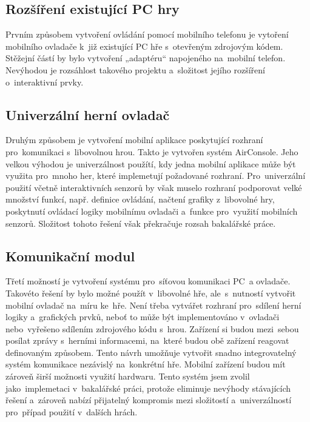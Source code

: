 \documentclass[thesis=B,czech,hidelinks]{FITthesis}[2012/06/26] %
\begin{document}
\subsection{Rozšíření existující PC hry}

Prvním způsobem vytvoření ovládání pomocí mobilního telefonu je vytoření mobilního ovladače k~již existující PC hře s~otevřeným zdrojovým kódem. Stěžejní částí by bylo vytvoření „adaptéru“ napojeného na~mobilní telefon. Nevýhodou je rozsáhlost takového projektu a~složitost jejího rozšíření o~interaktivní prvky.

\subsection{Univerzální herní ovladač}

Druhým způsobem je vytvoření mobilní aplikace poskytující rozhraní pro~komunikaci s~libovolnou hrou. Takto je vytvořen systém AirConsole. Jeho velkou výhodou je univerzálnost použítí, kdy jedna mobilní aplikace může být využita pro~mnoho her, které implemetují požadované rozhraní. Pro~univerzální použití včetně interaktivních senzorů by však muselo rozhraní podporovat velké množství funkcí, např. definice ovládání, načtení grafiky z~libovolné hry, poskytnutí ovládací logiky mobilnímu ovladači a~funkce pro~využití mobilních senzorů. Složitost tohoto řešení však překračuje rozsah bakalářské práce.

\subsection{Komunikační modul}

Třetí možností je vytvoření systému pro~síťovou komunikaci PC~a ovladače. Takovéto řešení by bylo možné použít v~libovolné hře, ale~s~nutností vytvořit mobilní ovladač na~míru ke~hře. Není třeba vytvářet rozhraní pro~sdílení herní logiky a~grafických prvků, neboť to může být implementováno v~ovladači nebo~vyřešeno sdílením zdrojového kódu s~hrou. Zařízení si budou mezi~sebou posílat zprávy s~herními informacemi, na~které budou obě zařízení reagovat definovaným způsobem. Tento návrh umožňuje vytvořit snadno integrovatelný systém komunikace nezávislý na~konkrétní hře. Mobilní zařízení budou mít zároveň širší možnosti využití hardwaru. Tento systém jsem zvolil jako~implemetaci v~bakalářské práci, protože eliminuje nevýhody stávajících řešení a~zároveň nabízí přijatelný kompromis mezi složitostí a~univerzálností pro~případ použití v~dalších hrách. 
\end{document}
